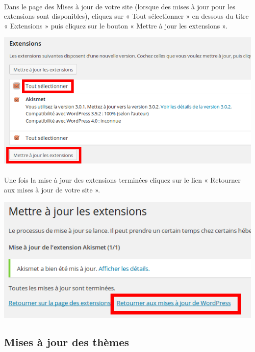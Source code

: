 \documentclass[10pt,a4paper]{article}
\begin{document}
\paragraph{}Dans le page des Mises à jour de votre site (lorsque des mises à jour pour les extensions sont disponibles), cliquez sur « Tout sélectionner » en dessous du titre « Extensions » puis cliquez sur le bouton « Mettre à jour les extensions ».
\begin{center}
\includegraphics[scale=0.35]{img/0053.png}
\end{center}
\paragraph{}Une fois la mise à jour des extensions terminées cliquez sur le lien « Retourner aux mises à jour de votre site ».
\begin{center}
\includegraphics[scale=0.35]{img/0054.png}
\end{center}
\subsection{Mises à jour des thèmes}
\end{document}
